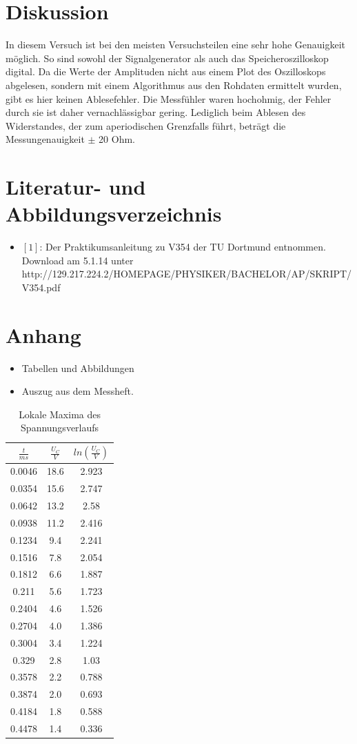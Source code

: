 \documentclass[11pt,ngerman,a4paper]{article}
\begin{document}
\section{Diskussion}
In diesem Versuch ist bei den meisten Versuchsteilen eine sehr hohe Genauigkeit möglich. So sind sowohl der Signalgenerator als auch das Speicheroszilloskop digital. Da die Werte der Amplituden nicht aus einem Plot des Oszilloskops abgelesen, sondern mit einem Algorithmus aus den Rohdaten ermittelt wurden, gibt es hier keinen Ablesefehler. Die Messfühler waren hochohmig, der Fehler durch sie ist daher vernachlässigbar gering. Lediglich beim Ablesen des Widerstandes, der zum aperiodischen Grenzfalls führt, beträgt die Messungenauigkeit $\pm$ 20 Ohm.
\section{Literatur- und Abbildungsverzeichnis}
\begin{itemize}
\item $[1]$: Der Praktikumsanleitung zu V354 der TU Dortmund entnommen. Download am 5.1.14 unter \newline http://129.217.224.2/HOMEPAGE/PHYSIKER/BACHELOR/AP/SKRIPT/V354.pdf
\end{itemize}
\section{Anhang}
\begin{itemize}
\item Tabellen und Abbildungen
\item Auszug aus dem Messheft.


\end{itemize}

\newpage
\begin{table}[H]
\centering
\begin{tabular}{|c|c|c|}
\hline
$\frac{t}{ms}$ & $\frac{U_C}{V}$ & $ln(\frac{U_C}{V})$ \\
\hline
0.0046 & 18.6 & 2.923\\
0.0354 & 15.6 & 2.747\\
0.0642 & 13.2 & 2.58\\
0.0938 & 11.2 & 2.416\\
0.1234 & 9.4 & 2.241\\
0.1516 & 7.8 & 2.054\\
0.1812 & 6.6 & 1.887\\
0.211 & 5.6 & 1.723\\
0.2404 & 4.6 & 1.526\\
0.2704 & 4.0 & 1.386\\
0.3004 & 3.4 & 1.224\\
0.329 & 2.8 & 1.03\\
0.3578 & 2.2 & 0.788\\
0.3874 & 2.0 & 0.693\\
0.4184 & 1.8 & 0.588\\
0.4478 & 1.4 & 0.336\\
\hline
\end{tabular}
\label{mtab1}
\caption{Lokale Maxima des Spannungsverlaufs}
\end{table}
\end{document}
